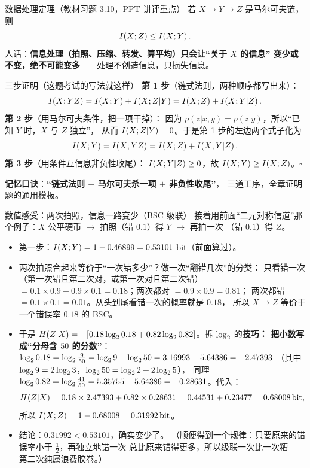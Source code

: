 \begin{defbox}{数据处理定理（教材习题 3.10，PPT 讲评重点）}
若 $X\to Y\to Z$ 是马尔可夫链，则
\[
I\!\left(X;Z\right)\le I\!\left(X;Y\right).
\]
人话：\textbf{信息处理（拍照、压缩、转发、算平均）只会让“关于 $X$ 的信息”
变少或不变，绝不可能变多}——处理不创造信息，只损失信息。
\end{defbox}

\begin{calc}{三步证明（这题考试的写法就这样）}
\textbf{第 1 步}（链式法则，两种顺序都写出来）：
\[
I\!\left(X;YZ\right)=I\!\left(X;Y\right)+I\!\left(X;Z|Y\right)=I\!\left(X;Z\right)+I\!\left(X;Y|Z\right).
\]
\textbf{第 2 步}（用马尔可夫条件，把一项干掉）：
因为 $p(z|x,y)=p(z|y)$，所以“已知 $Y$ 时，$X$ 与 $Z$ 独立”，
从而 $I\!\left(X;Z|Y\right)=0$。于是第 1 步的左边两个式子化为
\[
I\!\left(X;Y\right)=I\!\left(X;YZ\right)=I\!\left(X;Z\right)+I\!\left(X;Y|Z\right).
\]
\textbf{第 3 步}（用条件互信息非负性收尾）：
$I\!\left(X;Y|Z\right)\ge0$，故 $I\!\left(X;Y\right)\ge I\!\left(X;Z\right)$。$\square$

\textbf{记忆口诀}：\textbf{“链式法则 $+$ 马尔可夫杀一项 $+$ 非负性收尾”}，
三道工序，全章证明题的通用模板。
\end{calc}

\begin{calc}{数值感受：两次拍照，信息一路变少（BSC 级联）}
接着用前面“二元对称信道”那个例子：$X$ 公平硬币 $\to$ 拍照（错 $0.1$）得 $Y$ $\to$ 再拍一次
（错 $0.1$）得 $Z$。
\begin{itemize}[leftmargin=1.4em,itemsep=1pt,topsep=1pt]
  \item 第一步：$I\!\left(X;Y\right)=1-0.46899=0.53101$ bit（前面算过）。
  \item 两次拍照合起来等价于“一次错多少”？做一次“翻错几次”的分类：
        只看错一次（第一次错且第二次对，或第一次对且第二次错）
        $=0.1\times0.9+0.9\times0.1=0.18$；两次都对 $=0.9\times0.9=0.81$；
        两次都错 $=0.1\times0.1=0.01$。从头到尾看错一次的概率就是 $0.18$，
        所以 $X\to Z$ 等价于一个错误率 $0.18$ 的 BSC。
  \item 于是 $H\!\left(Z|X\right)=-[0.18\log_{2}0.18+0.82\log_{2}0.82]$。拆 $\log_{2}$ 的\textbf{技巧：
        把小数写成“分母含 $50$ 的分数”}：
        $\log_{2}0.18=\log_{2}\frac{9}{50}=\log_{2}9-\log_{2}50=3.16993-5.64386=-2.47393$
        （其中 $\log_{2} 9=2\log_{2} 3$，$\log_{2} 50=\log_{2}2+2\log_{2}5$），
        同理 $\log_{2}0.82=\log_{2}\frac{41}{50}=5.35755-5.64386=-0.28631$。代入：
        \[
        H\!\left(Z|X\right)=0.18\times2.47393+0.82\times0.28631
        =0.44531+0.23477=0.68008\,\text{bit} ,
        \]
        所以 $I\!\left(X;Z\right)=1-0.68008=0.31992\,\text{bit}$。
  \item 结论：$0.31992<0.53101$，确实变少了。
        （顺便得到一个规律：只要原来的错误率小于 $\frac12$，再独立地错一次
        总比原来错得更多，所以级联一次比一次糟——第二次纯属浪费胶卷。）
\end{itemize}
\end{calc}

